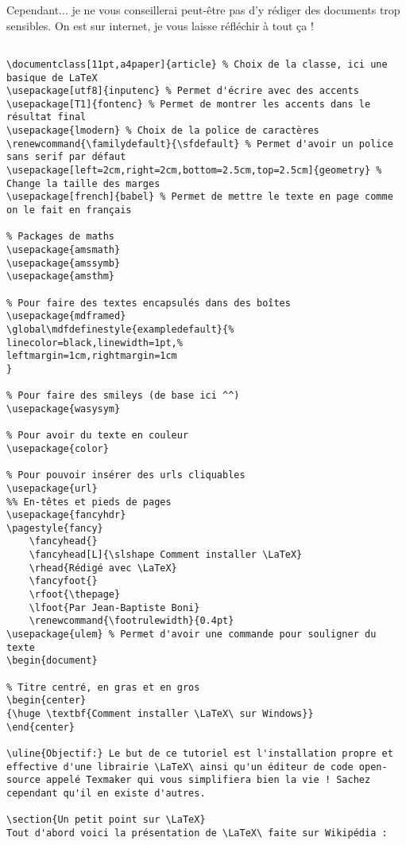 \documentclass[11pt,a4paper]{article} %
\renewcommand{\familydefault}{\sfdefault} %
\renewcommand{\footrulewidth}{0.4pt}
\begin{document}
Cependant... je ne vous conseillerai peut-être pas d'y rédiger des documents trop sensibles. On est sur internet, je vous laisse réfléchir à tout ça !

\clearpage

\begin{Verbatim}[breaklines=true]

\documentclass[11pt,a4paper]{article} % Choix de la classe, ici une basique de LaTeX
\usepackage[utf8]{inputenc} % Permet d'écrire avec des accents
\usepackage[T1]{fontenc} % Permet de montrer les accents dans le résultat final
\usepackage{lmodern} % Choix de la police de caractères
\renewcommand{\familydefault}{\sfdefault} % Permet d'avoir un police sans serif par défaut
\usepackage[left=2cm,right=2cm,bottom=2.5cm,top=2.5cm]{geometry} % Change la taille des marges
\usepackage[french]{babel} % Permet de mettre le texte en page comme on le fait en français

% Packages de maths
\usepackage{amsmath}
\usepackage{amssymb}
\usepackage{amsthm}

% Pour faire des textes encapsulés dans des boîtes
\usepackage{mdframed}
\global\mdfdefinestyle{exampledefault}{%
linecolor=black,linewidth=1pt,%
leftmargin=1cm,rightmargin=1cm
}

% Pour faire des smileys (de base ici ^^)
\usepackage{wasysym}

% Pour avoir du texte en couleur
\usepackage{color}

% Pour pouvoir insérer des urls cliquables
\usepackage{url}
%% En-têtes et pieds de pages
\usepackage{fancyhdr}
\pagestyle{fancy}
	\fancyhead{}
	\fancyhead[L]{\slshape Comment installer \LaTeX}
	\rhead{Rédigé avec \LaTeX}
	\fancyfoot{}
	\rfoot{\thepage}
	\lfoot{Par Jean-Baptiste Boni}
	\renewcommand{\footrulewidth}{0.4pt}
\usepackage{ulem} % Permet d'avoir une commande pour souligner du texte
\begin{document}

% Titre centré, en gras et en gros
\begin{center}
{\huge \textbf{Comment installer \LaTeX\ sur Windows}}
\end{center}

\uline{Objectif:} Le but de ce tutoriel est l'installation propre et effective d'une librairie \LaTeX\ ainsi qu'un éditeur de code open-source appelé Texmaker qui vous simplifiera bien la vie ! Sachez cependant qu'il en existe d'autres.

\section{Un petit point sur \LaTeX}
Tout d'abord voici la présentation de \LaTeX\ faite sur Wikipédia :


\end{Verbatim}
\end{document}
